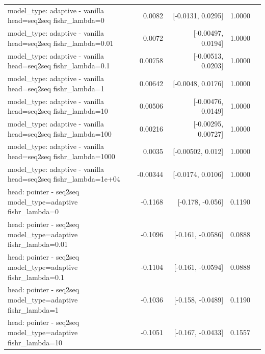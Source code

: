 \documentclass[10pt]{article}
\makeatletter
\newcommand{\stackcell}[1]{\begin{tabular}[t]{@{}l@{}}#1\end{tabular}}
\makeatother
\begin{document}
{\begin{longtable}{lrrrl}
\stackcell{model\_type: adaptive - vanilla\\\footnotesize head=seq2seq fishr\_lambda=0 } & 0.0082 & [-0.0131, 0.0295] & 1.0000 & \\
\stackcell{model\_type: adaptive - vanilla\\\footnotesize head=seq2seq fishr\_lambda=0.01 } & 0.0072 & [-0.00497, 0.0194] & 1.0000 & \\
\stackcell{model\_type: adaptive - vanilla\\\footnotesize head=seq2seq fishr\_lambda=0.1 } & 0.00758 & [-0.00513, 0.0203] & 1.0000 & \\
\stackcell{model\_type: adaptive - vanilla\\\footnotesize head=seq2seq fishr\_lambda=1 } & 0.00642 & [-0.0048, 0.0176] & 1.0000 & \\
\stackcell{model\_type: adaptive - vanilla\\\footnotesize head=seq2seq fishr\_lambda=10 } & 0.00506 & [-0.00476, 0.0149] & 1.0000 & \\
\stackcell{model\_type: adaptive - vanilla\\\footnotesize head=seq2seq fishr\_lambda=100 } & 0.00216 & [-0.00295, 0.00727] & 1.0000 & \\
\stackcell{model\_type: adaptive - vanilla\\\footnotesize head=seq2seq fishr\_lambda=1000 } & 0.0035 & [-0.00502, 0.012] & 1.0000 & \\
\stackcell{model\_type: adaptive - vanilla\\\footnotesize head=seq2seq fishr\_lambda=1e+04 } & -0.00344 & [-0.0174, 0.0106] & 1.0000 & \\
\stackcell{head: pointer - seq2seq\\\footnotesize model\_type=adaptive fishr\_lambda=0 } & -0.1168 & [-0.178, -0.056] & 0.1190 & \\
\stackcell{head: pointer - seq2seq\\\footnotesize model\_type=adaptive fishr\_lambda=0.01 } & -0.1096 & [-0.161, -0.0586] & 0.0888 & \\
\stackcell{head: pointer - seq2seq\\\footnotesize model\_type=adaptive fishr\_lambda=0.1 } & -0.1104 & [-0.161, -0.0594] & 0.0888 & \\
\stackcell{head: pointer - seq2seq\\\footnotesize model\_type=adaptive fishr\_lambda=1 } & -0.1036 & [-0.158, -0.0489] & 0.1190 & \\
\stackcell{head: pointer - seq2seq\\\footnotesize model\_type=adaptive fishr\_lambda=10 } & -0.1051 & [-0.167, -0.0433] & 0.1557 & \\

\end{longtable}}
\end{document}
